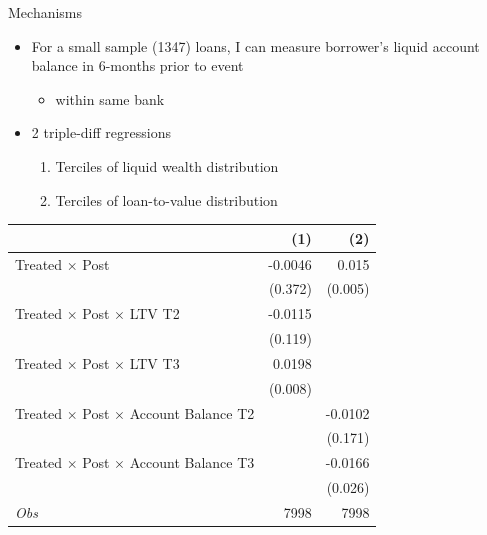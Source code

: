 \documentclass[ignorenonframetext,aspectratio=169]{beamer}
\providecommand{\tightlist}{%
  \setlength{\itemsep}{0pt}\setlength{\parskip}{0pt}}
\begin{document}
\begin{frame}{Mechanisms}

\begin{itemize}
\tightlist
\item
  For a small sample (1347) loans, I can measure borrower's liquid
  account balance in 6-months prior to event

  \begin{itemize}
  \tightlist
  \item
    within same bank
  \end{itemize}
\item
  2 triple-diff regressions

  \begin{enumerate}
  \def\labelenumi{\arabic{enumi}.}
  \tightlist
  \item
    Terciles of liquid wealth distribution
  \item
    Terciles of loan-to-value distribution
  \end{enumerate}
\end{itemize}

\end{frame}

\begin{frame}{}

\begin{center}
\begin{tabular}{lrr}
\toprule
      & (1)   & (2) \\
\midrule
Treated $\times$ Post & -0.0046 & 0.015 \\
      & (0.372) & (0.005) \\
Treated $\times$ Post $\times$ LTV T2 & -0.0115 &  \\
      & (0.119) &  \\
Treated $\times$ Post $\times$ LTV T3 & 0.0198 &  \\
      & (0.008) &  \\
Treated $\times$ Post $\times$ Account Balance T2 &       & -0.0102 \\
      &       & (0.171) \\
Treated $\times$ Post $\times$ Account Balance T3 &       & -0.0166 \\
      &       & (0.026) \\
      \midrule
 {\it Obs}     & 7998  & 7998 \\
\bottomrule
\end{tabular}
\end{center}

\end{frame}
\end{document}
